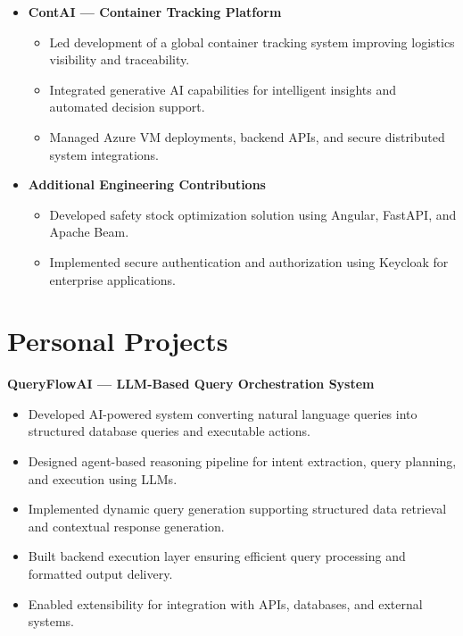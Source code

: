 \documentclass[letterpaper,10pt]{article}
\begin{document}
\begin{itemize}
\item \textbf{ContAI — Container Tracking Platform}
\begin{itemize}
    \item Led development of a global container tracking system improving logistics visibility and traceability.
    \item Integrated generative AI capabilities for intelligent insights and automated decision support.
    \item Managed Azure VM deployments, backend APIs, and secure distributed system integrations.
\end{itemize}

\item \textbf{Additional Engineering Contributions}
\begin{itemize}
    \item Developed safety stock optimization solution using Angular, FastAPI, and Apache Beam.
    \item Implemented secure authentication and authorization using Keycloak for enterprise applications.
\end{itemize}

\end{itemize}

\section*{Personal Projects}

\textbf{QueryFlowAI — LLM-Based Query Orchestration System} \\
\begin{itemize}
    \item Developed AI-powered system converting natural language queries into structured database queries and executable actions.
    \item Designed agent-based reasoning pipeline for intent extraction, query planning, and execution using LLMs.
    \item Implemented dynamic query generation supporting structured data retrieval and contextual response generation.
    \item Built backend execution layer ensuring efficient query processing and formatted output delivery.
    \item Enabled extensibility for integration with APIs, databases, and external systems.
\end{itemize}
\end{document}
